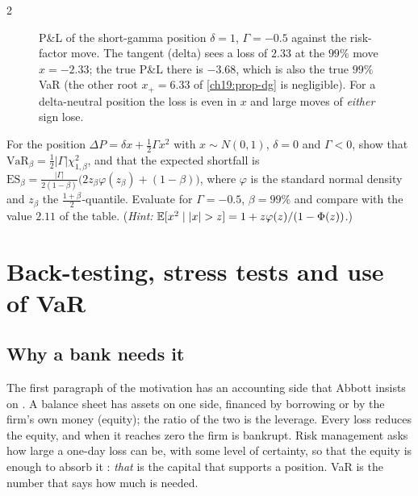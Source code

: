 \begin{paracol}{2}
\begin{figure}[ht]
\centering
{}
\caption{P\&L of the short-gamma position $\delta=1$, $\Gamma=-0.5$ against the risk-factor move. The tangent (delta) sees a loss of $2.33$ at the $99\%$ move $x=-2.33$; the true P\&L there is $-3.68$, which is also the true $99\%$ VaR (the other root $x_+=6.33$ of \cref{ch19:prop-dg} is negligible). For a delta-neutral position the loss is even in $x$ and large moves of \emph{either} sign lose.}\label{ch19:fig-gamma}
\end{figure}

\begin{exercise}
For the position $\Delta P=\delta x+\frac12\Gamma x^2$ with $x\sim N(0,1)$, $\delta=0$ and $\Gamma<0$, show that $\mathrm{VaR}_\beta=\frac12|\Gamma|\chi^2_{1,\beta}$, and that the expected shortfall is $\mathrm{ES}_\beta=\frac{|\Gamma|}{2(1-\beta)}\bigl(2z_\beta\varphi(z_\beta)+(1-\beta)\bigr)$, where $\varphi$ is the standard normal density and $z_\beta$ the $\frac{1+\beta}2$-quantile. Evaluate for $\Gamma=-0.5$, $\beta=99\%$ and compare with the value $2.11$ of the table. (\emph{Hint:} $\E[x^2\mid|x|>z]=1+z\varphi(z)/(1-\Phi(z))$.)
\end{exercise}

\section{Back-testing, stress tests and use of VaR}\label{ch19:sec-bt}
\subsection{Why a bank needs it}
The first paragraph of the motivation has an accounting side that Abbott insists on . A balance sheet has assets on one side, financed by borrowing or by the firm's own money (equity); the ratio of the two is the leverage. Every loss reduces the equity, and when it reaches zero the firm is bankrupt. Risk management asks how large a one-day loss can be, with some level of certainty, so that the equity is enough to absorb it : \emph{that} is the capital that supports a position. VaR is the number that says how much is needed.


\end{paracol}
